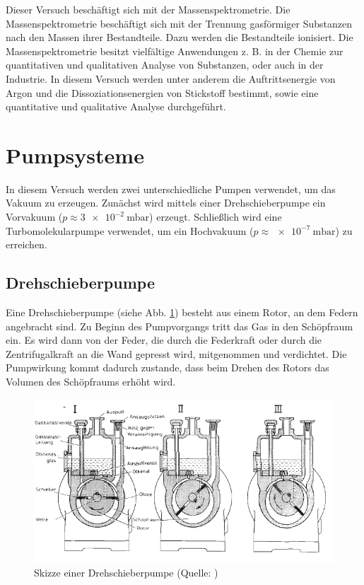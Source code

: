 Dieser Versuch beschäftigt sich mit der Massenspektrometrie. Die Massenspektrometrie beschäftigt sich mit der Trennung gasförmiger Substanzen nach den Massen ihrer Bestandteile. Dazu werden die Bestandteile ionisiert. Die Massenspektrometrie besitzt vielfältige Anwendungen z. B. in der Chemie zur quantitativen und qualitativen Analyse von Substanzen, oder auch in der Industrie.
In diesem Versuch werden unter anderem die Auftrittsenergie von Argon und die Dissoziationsenergien von Stickstoff bestimmt, sowie eine quantitative und qualitative Analyse durchgeführt.

\section{Pumpsysteme}

In diesem Versuch werden zwei unterschiedliche Pumpen verwendet, um das Vakuum zu erzeugen. Zunächst wird mittels einer Drehschieberpumpe ein Vorvakuum ($p\approx\SI{3e-2}{\milli\bar}$) erzeugt. Schließlich wird eine Turbomolekularpumpe verwendet, um ein Hochvakuum ($p\approx\SI{e-7}{\milli\bar}$) zu erreichen.

\subsection{Drehschieberpumpe}

Eine Drehschieberpumpe (siehe Abb. \ref{fig011}) besteht aus einem Rotor, an dem Federn angebracht sind. Zu Beginn des Pumpvorgangs tritt das Gas in den Schöpfraum ein. Es wird dann von der Feder, die durch die Federkraft oder durch die Zentrifugalkraft an die Wand gepresst wird, mitgenommen und verdichtet.
Die Pumpwirkung kommt dadurch zustande, dass beim Drehen des Rotors das Volumen des Schöpfraums erhöht wird.

\begin{figure}[tb]
 \centering
 \includegraphics[scale=0.7]{./fig/massenspek_drehschieber.png}
 \caption{Skizze einer Drehschieberpumpe (Quelle: \cite[S. 7]{Litmap})}
 \label{fig011}
\end{figure}

